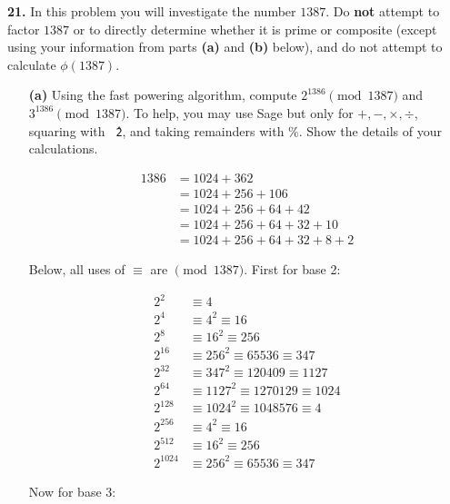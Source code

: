 \documentclass[12pt]{amsart}
\begin{document}
{\bf 21.}  In this problem you will investigate the number $1387$.  Do {\bf not} attempt to factor $1387$ or to directly determine whether it is prime or composite (except using your information from parts {\bf (a)} and {\bf (b)} below), and do not attempt to calculate $\phi(1387)$.
\begin{itemize}
	\item[{\bf (a)}]  Using the fast powering algorithm, compute $2^{1386}\pmod{1387}$ and $3^{1386}\pmod{1387}$.  To help, you may use Sage but only for $+,-,\times,\div$, squaring with {\tt \^\,2}, and taking remainders with $\%$.  Show the details of your calculations.
	
\begin{equation*}
\begin{split}
1386 & = 1024 + 362 \\
	&= 1024 + 256 + 106 \\
	&= 1024 + 256 + 64 + 42 \\
	&= 1024 + 256 + 64 + 32 + 10 \\
	&= 1024 + 256 + 64 + 32 + 8 + 2 
\end{split}
\end{equation*}	

Below, all uses of $\equiv$ are $\pmod{1387}$. First for base 2:

\begin{equation*}
\begin{split}
2^2 & \equiv 4 \\
2^4 & \equiv 4^2 \equiv 16 \\
2^8 & \equiv 16^2 \equiv 256 \\
2^{16}  & \equiv 256^2 \equiv 65536 \equiv 347 \\
2^{32} & \equiv 347^2 \equiv 120409 \equiv 1127 \\
2^{64} & \equiv 1127^2 \equiv 1270129 \equiv 1024 \\
2^{128} & \equiv 1024^2 \equiv 1048576 \equiv 4 \\
2^{256} & \equiv 4^2 \equiv 16 \\
2^{512} & \equiv 16^2 \equiv 256 \\
2^{1024} & \equiv 256^2 \equiv 65536 \equiv 347
\end{split}
\end{equation*}	

Now for base 3:


\end{itemize}
\end{document}
